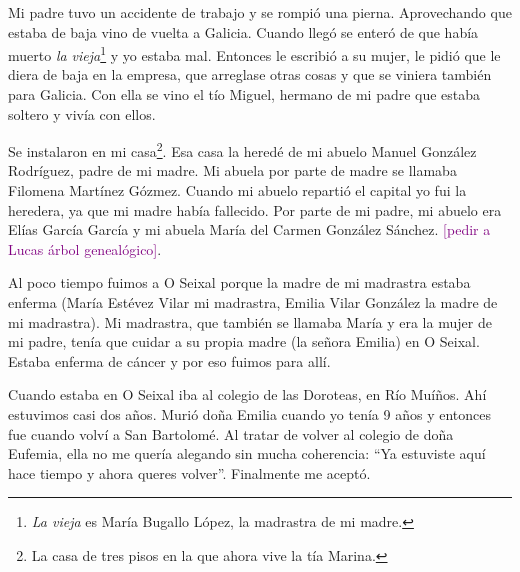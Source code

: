 \documentclass[12pt,a5paper]{book}
\begin{document}
Mi padre tuvo un accidente de trabajo y se rompió una pierna. Aprovechando que estaba de baja vino de vuelta a Galicia. Cuando llegó se enteró de que había muerto \textit{la vieja}\footnote{\textit{La vieja} es María Bugallo López, la madrastra de mi madre.} y yo estaba mal. Entonces le escribió a su mujer, le pidió que le diera de baja en la empresa, que arreglase otras cosas y que se viniera también para Galicia. Con ella se vino el tío Miguel, hermano de mi padre que estaba soltero y vivía con ellos.

Se instalaron en mi casa\footnote{La casa de tres pisos en la que ahora vive la tía Marina.}. Esa casa la heredé de mi abuelo Manuel González Rodríguez, padre de mi madre. Mi abuela por parte de madre se llamaba Filomena Martínez Gózmez. Cuando mi abuelo repartió el capital yo fui la heredera, ya que mi madre había fallecido. Por parte de mi padre, mi abuelo era Elías García García y mi abuela María del Carmen González Sánchez. \textcolor{purple}{[pedir a Lucas árbol genealógico]}.

Al poco tiempo fuimos a O Seixal porque la madre de mi madrastra estaba enferma (María Estévez Vilar mi madrastra, Emilia Vilar González la madre de mi madrastra). Mi madrastra, que también se llamaba María y era la mujer de mi padre, tenía que cuidar a su propia madre (la señora Emilia) en O Seixal. Estaba enferma de cáncer y por eso fuimos para allí.

Cuando estaba en O Seixal iba al colegio de las Doroteas, en Río Muíños. Ahí estuvimos casi dos años. Murió doña Emilia cuando yo tenía 9 años y entonces fue cuando volví a San Bartolomé. Al tratar de volver al colegio de doña Eufemia, ella no me quería alegando sin mucha coherencia: ``Ya estuviste aquí hace tiempo y ahora queres volver''. Finalmente me aceptó.

\end{document}
